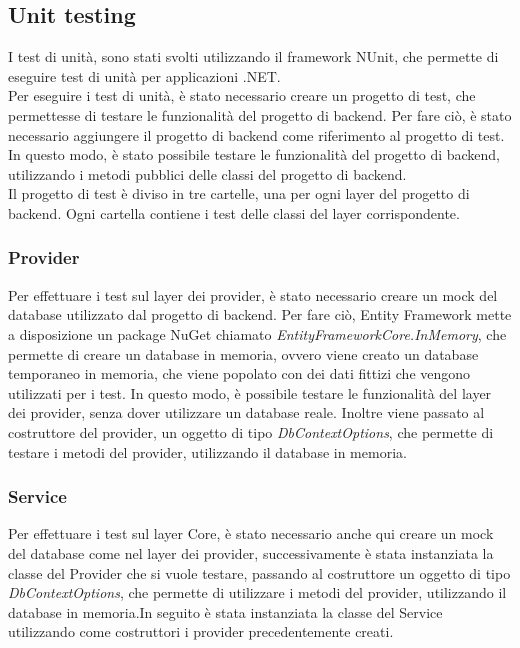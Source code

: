\subsection{Unit testing}
I test di unità, sono stati svolti utilizzando il framework NUnit, che permette di eseguire test di unità per applicazioni .NET.\\
Per eseguire i test di unità, è stato necessario creare un progetto di test, che permettesse di testare le funzionalità del progetto di backend. Per fare ciò, è stato necessario aggiungere il progetto di backend come riferimento al progetto di test. In questo modo, è stato possibile testare le funzionalità del progetto di backend, utilizzando i metodi pubblici delle classi del progetto di backend.\\
Il progetto di test è diviso in tre cartelle, una per ogni layer del progetto di backend. Ogni cartella contiene i test delle classi del layer corrispondente.\\
\subsubsection{Provider}
Per effettuare i test sul layer dei provider, è stato necessario creare un mock del database utilizzato dal progetto di backend. Per fare ciò, Entity Framework mette a disposizione un package NuGet chiamato \textit{EntityFrameworkCore.InMemory}, che permette di creare un database in memoria, ovvero viene creato un database temporaneo in memoria, che viene popolato con dei dati fittizi che vengono utilizzati per i test. In questo modo, è possibile testare le funzionalità del layer dei provider, senza dover utilizzare un database reale. Inoltre viene passato al costruttore del provider, un oggetto di tipo \textit{DbContextOptions}, che permette di testare i metodi del provider, utilizzando il database in memoria.\\

\subsubsection{Service}
Per effettuare i test sul layer Core, è stato necessario anche qui creare un mock del database come nel layer dei provider, successivamente è stata instanziata la classe del Provider che si vuole testare, passando al costruttore un oggetto di tipo \textit{DbContextOptions}, che permette di utilizzare i metodi del provider, utilizzando il database in memoria.In seguito è stata instanziata la classe del Service utilizzando come costruttori i provider precedentemente creati.\\

